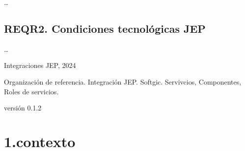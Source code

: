 \documentclass[
  paper=a4,
  ,captions=tableheading
]{scrartcl}
\begin{document}
\ldots{}

\hypertarget{reqr2.-condiciones-tecnoluxf3gicas-jep}{%
\subsection{REQR2. Condiciones tecnológicas
JEP}\label{reqr2.-condiciones-tecnoluxf3gicas-jep}}

\ldots{}

Integraciones JEP, 2024

Organización de referencia. Integración JEP. Softgic. Servivcios,
Componentes, Roles de servicios.

versión 0.1.2

\hypertarget{contexto}{%
\section{1.contexto}\label{contexto}}
\end{document}
